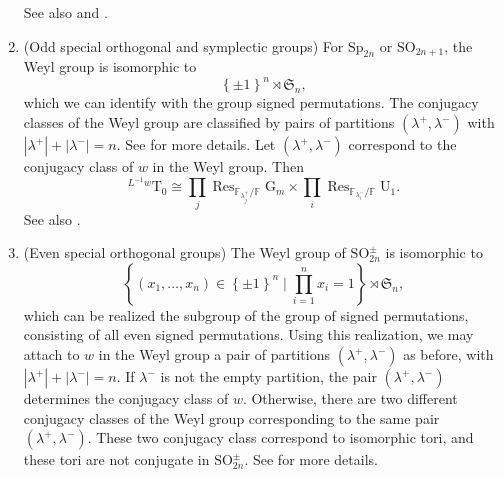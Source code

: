 \documentclass[12pt, reqno]{amsart}
\theoremstyle{definition}
\theoremstyle{definition}
\theoremstyle{definition}
\newcommand{\lengthof}{\ell}
\newcommand{\sizeof}[1]{\left|#1\right|}
\newcommand{\involution}[1]{#1^{c}}
\newcommand{\diag}{\mathrm{diag}}
\newcommand{\SO}{\mathrm{SO}}
\newcommand{\Sp}{\mathrm{Sp}}
\newcommand{\UnitaryGroup}{\mathrm{U}}
\newcommand{\finiteField}{\mathbb{F}}
\newcommand{\finiteFieldExtension}[1]{\finiteField_{#1}}
\newcommand{\restrictionOfScalars}[3]{\operatorname{Res}_{#1 \slash #2}{#3}}
\newcommand{\multiplcativeScheme}{\algebraicGroup{G}_m}
\newcommand{\algebraicGroup}[1]{\boldsymbol{\mathrm{#1}}}
\newcommand{\SymmetricGroup}{\mathfrak{S}}
\begin{document}
\begin{enumerate}
	See also \cite[Section 2.3]{ThiemVinroot2009} and \cite[Section 2.2]{SaitoShinoda2000}.
    \item (Odd special orthogonal and symplectic groups)
    For $\algebraicGroup{\Sp}_{2n}$ or $\algebraicGroup{\SO}_{2n+1}$, the Weyl group is isomorphic to $$\left\{\pm 1\right\}^n \rtimes \SymmetricGroup_n,$$ which we can identify with the group signed permutations. The conjugacy classes of the Weyl group are classified by pairs of partitions $(\lambda^+,\lambda^-)$ with $\sizeof{\lambda^+} + \sizeof{\lambda^-} = n$. See \cite[Section 2.2]{KonvalinkaMatjavPfeiffer2011} for more details. Let $(\lambda^+,\lambda^-)$ correspond to the conjugacy class of $w$ in the Weyl group. Then
		$$^{L^{-1}w}\algebraicGroup{T}_0 \cong \prod_{j} \restrictionOfScalars{\finiteFieldExtension{\lambda^+_j}}{\finiteField}{\multiplcativeScheme} \times \prod_{i} \restrictionOfScalars{\finiteFieldExtension{\lambda^-_i}}{\finiteField}{\algebraicGroup{\UnitaryGroup}_1}.$$
		See also \cite[Section 3.2 Part (B)]{Zalesski2018}.
        \item (Even special orthogonal groups) The Weyl group of $\algebraicGroup{SO}_{2n}^{\pm}$ is isomorphic to $$\left\{ \left(x_1,\dots,x_n\right) \in \left\{\pm 1\right\}^n \mid \prod_{i=1}^n x_i = 1\right\} \rtimes \SymmetricGroup_n,$$ which can be realized the subgroup of the group of signed permutations, consisting of all even signed permutations. Using this realization, we may attach to $w$ in the Weyl group a pair of partitions $\left(\lambda^+, \lambda^-\right)$ as before, with $\sizeof{\lambda^+} + \sizeof{\lambda^-} = n$. If $\lambda^{-}$ is not the empty partition, the pair $\left(\lambda^+, \lambda^-\right)$ determines the conjugacy class of $w$. Otherwise, there are two different conjugacy classes of the Weyl group corresponding to the same pair $\left(\lambda^{+}, \lambda^{-}\right)$. These two conjugacy class correspond to isomorphic tori, and these tori are not conjugate in $\algebraicGroup{\SO}_{2n}^{\pm}$. See \cite[Section 2.3]{KonvalinkaMatjavPfeiffer2011} for more details.

\end{enumerate}
\end{document}
